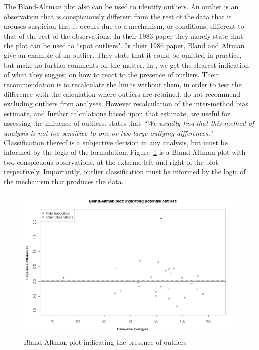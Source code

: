 \documentclass[12pt, a4paper]{report}
\theoremstyle{plain}
\theoremstyle{definition}
\theoremstyle{remark}
\begin{document}
The Bland-Altman plot also can be used to identify outliers. An outlier is an observation that is conspicuously different from the rest of the data that it arouses suspicion that it occurs due to a mechanism, or conditions, different to that of the rest of the observations. In their 1983 paper they merely state that the plot can be used to
``spot outliers". In their 1986 paper, Bland and Altman give an example of an
outlier. They state that it could be omitted in practice, but make
no further comments on the matter. In \citet{BA99}, we get the clearest indication of
what they suggest on how to react to the presence of
outliers. Their recommendation is to recalculate the limits
without them, in order to test the difference with the calculation
where outliers are retained. \citet*{BA99} do not recommend excluding outliers from analyses. However recalculation of the inter-method bias estimate, and further calculations based upon that estimate, are useful for assessing the influence of outliers. \citet{BA99} states that \emph{``We usually find that this method of analysis is not too sensitive to one or two large outlying differences."}
Classification thereof is a subjective decision in any analysis, but must be informed by the logic of the formulation. Figure~\ref{BAOutliers} is a Bland-Altman plot with two
conspicuous observations, at the extreme left and right of the
plot respectively. Importantly, outlier classification must be informed by the logic of the mechanism that produces the data.
	


	
	\begin{figure}[h!]
		\begin{center}
			\includegraphics[width=125mm]{images/BAOutliers.jpeg}
			\caption{Bland-Altman plot indicating the presence of outliers}\label{BAOutliers}
		\end{center}
	\end{figure}
 
\end{document}
